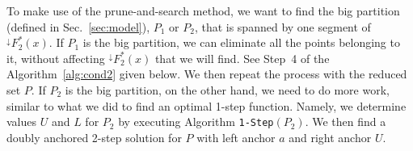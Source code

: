 \documentclass[preprint,10pt]{elsarticle}
\newcommand{\hide}[1]{}
\newtheorem{procedure}{Procedure}
\begin{document}
To make use of the prune-and-search method,
we want to find the big partition (defined in Sec.~\ref{sec:model}),
$P_1$ or $P_2$, that is spanned by one segment of $^{\downarrow}\!F^*_2(x)$.
\hide{\begin{procedure} {\tt Big2-$l$-Anc}$(P,a)$\label{proc:big2}
\begin{enumerate}
\item
Divide $P$ into left partition $P_1$ and right partition $P_2$,
whose sizes differ by at most one.\footnote{As before,
we assume that the points have different $y$-coordinates.
}
\item
Let $s_1$ be the segment with $s_1.y=a$ spanning $P_1$,
and let $s_2$ be the 1-step (optimal) solution for $P_2$.
\item
If $D(P_1, s_1) \leq D(P_2, s_2)$ (resp. $D(P_1, s_1) > D(P_2, s_2)$)
then $P_1$ (resp. $P_2$) is the big partition.
\end{enumerate}
\end{procedure}
}If $P_1$ is the big partition, we can eliminate all the points belonging to it,
without affecting $^{\downarrow}\!F^*_2(x)$ that we will find.
See Step~4 of the Algorithm~\ref{alg:cond2} given below.
We then repeat the process with the reduced set $P$.
If $P_2$ is the big partition, on the other hand, we need to do more work,
similar to what we did to find an optimal 1-step function.
Namely,
we determine values $U$ and $L$ for $P_2$ by executing Algorithm {\tt 1-Step}$(P_2)$.
We then find a doubly anchored 2-step solution for $P$ with left anchor $a$
and right anchor $U$.
\end{document}
